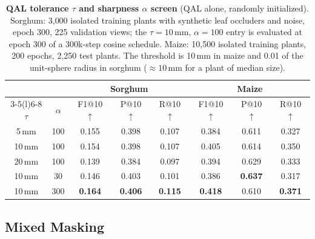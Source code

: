 \documentclass[10pt,twocolumn,letterpaper]{article}
\begin{document}
\begin{table}[t]
  \caption{\textbf{QAL tolerance $\tau$ and sharpness $\alpha$ screen} (QAL alone, randomly initialized). Sorghum:
  3{,}000 isolated training plants with synthetic leaf occluders and noise, epoch 300, 225 validation views; the
  $\tau=10$\,mm, $\alpha=100$ entry is evaluated at epoch 300 of a 300k-step cosine schedule. Maize: 10{,}500 isolated
  training plants, 200 epochs, 2{,}250 test plants. The threshold is 10\,mm in maize and 0.01 of the unit-sphere radius
  in sorghum ($\approx 10$\,mm for a plant of median size).}
  \label{tab:qal_params}
  \centering\footnotesize
  \setlength{\tabcolsep}{2.5pt}
  \begin{tabular}{@{}cccccccc@{}}
    \toprule
    & & \multicolumn{3}{c}{Sorghum} & \multicolumn{3}{c}{Maize} \\
    \cmidrule(lr){3-5}\cmidrule(l){6-8}
    $\tau$ & $\alpha$ & F1@10 $\uparrow$ & P@10 $\uparrow$ & R@10 $\uparrow$ & F1@10 $\uparrow$ & P@10 $\uparrow$ & R@10 $\uparrow$ \\
    \midrule
    5\,mm  & 100 & 0.155 & 0.398 & 0.107 & 0.384 & 0.611 & 0.327 \\
    10\,mm & 100 & 0.154 & 0.398 & 0.107 & 0.405 & 0.614 & 0.350 \\
    20\,mm & 100 & 0.139 & 0.384 & 0.097 & 0.394 & 0.629 & 0.333 \\
    10\,mm & 30  & 0.146 & 0.403 & 0.101 & 0.386 & \textbf{0.637} & 0.317 \\
    10\,mm & 300 & \textbf{0.164} & \textbf{0.406} & \textbf{0.115} & \textbf{0.418} & 0.610 & \textbf{0.371} \\
    \bottomrule
  \end{tabular}
\end{table}

\subsection{Mixed Masking}
\label{sec:abl_mixed}
\end{document}
